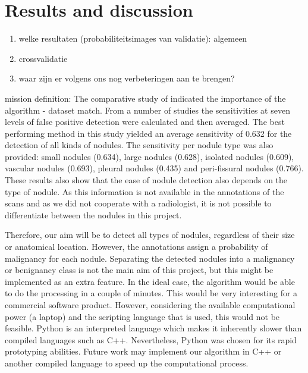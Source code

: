 \section{Results and discussion}

\begin{enumerate}
\item welke resultaten (probabiliteitsimages van validatie): algemeen
\item crossvalidatie
\item waar zijn er volgens ons nog verbeteringen aan te brengen?
\end{enumerate}



mission definition:
The comparative study of \cite{ginneken} indicated the importance of the
algorithm - dataset match. From a number of studies the sensitivities at seven
levels of false positive detection were calculated and then averaged. The best
performing method in this study yielded an average sensitivity of 0.632 for the
detection of all kinds of nodules. The sensitivity per nodule type was also
provided: small nodules (0.634), large nodules (0.628), isolated nodules
(0.609), vascular nodules (0.693), pleural nodules (0.435) and peri-fissural
nodules (0.766).
These results also show that the ease of nodule detection also depends on the
type of nodule. As this information is not available in the annotations of the
scans and as we did not cooperate with a radiologist, it is not possible to
differentiate between the nodules in this project.

Therefore, our aim will be to
detect all types of nodules, regardless of their size or anatomical location.
However, the annotations assign a probability of malignancy for each nodule.
Separating the detected nodules into a malignancy or benignancy class is not the
main aim of this project, but this might be implemented as an extra feature.
In the ideal case, the algorithm would be able to do the processing in a couple
of minutes. This would be very interesting for a commercial software product.
However, considering the available computational power (a laptop) and the
scripting language that is used, this would not be feasible. Python is an
interpreted language which makes it inherently slower than compiled languages
such as C++. Nevertheless, Python was chosen for its rapid prototyping
abilities. Future work may implement our algorithm in C++ or another compiled
language to speed up the computational process.
